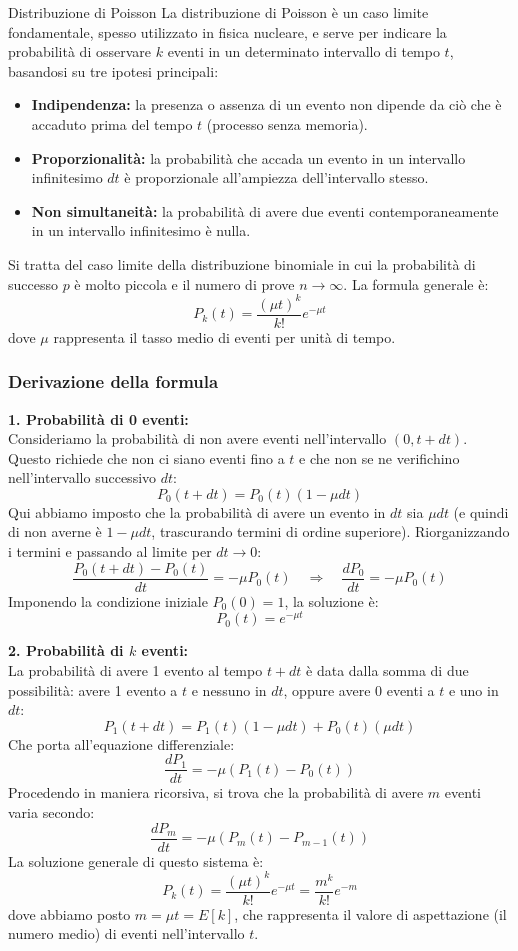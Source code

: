 \documentclass[openany,a4paper,12pt]{book}
\theoremstyle{remark}
\begin{document}
\begin{bressan}{Distribuzione di Poisson}
La distribuzione di Poisson è un caso limite fondamentale, spesso utilizzato in fisica nucleare, e serve per indicare la probabilità di osservare $k$ eventi in un determinato intervallo di tempo $t$, basandosi su tre ipotesi principali:
\begin{itemize}
    \item \textbf{Indipendenza:} la presenza o assenza di un evento non dipende da ciò che è accaduto prima del tempo $t$ (processo senza memoria).
    \item \textbf{Proporzionalità:} la probabilità che accada un evento in un intervallo infinitesimo $dt$ è proporzionale all'ampiezza dell'intervallo stesso.
    \item \textbf{Non simultaneità:} la probabilità di avere due eventi contemporaneamente in un intervallo infinitesimo è nulla.
\end{itemize}

Si tratta del caso limite della distribuzione binomiale in cui la probabilità di successo $p$ è molto piccola e il numero di prove $n \rightarrow \infty$. La formula generale è:
\[
    P_k(t)=\frac{(\mu t)^k}{k!}e^{-\mu t}
\]
dove $\mu$ rappresenta il tasso medio di eventi per unità di tempo.

\subsubsection*{Derivazione della formula}

\textbf{1. Probabilità di 0 eventi:} \\
Consideriamo la probabilità di non avere eventi nell'intervallo $(0, t+dt)$. Questo richiede che non ci siano eventi fino a $t$ e che non se ne verifichino nell'intervallo successivo $dt$:
\[
P_0(t+dt)=P_0(t)(1-\mu dt)
\]
Qui abbiamo imposto che la probabilità di avere un evento in $dt$ sia $\mu dt$ (e quindi di non averne è $1-\mu dt$, trascurando termini di ordine superiore). Riorganizzando i termini e passando al limite per $dt \to 0$:
\[
\frac{P_0(t+dt) - P_0(t)}{dt} = -\mu P_0(t) \quad \Rightarrow \quad \frac{dP_0}{dt} = -\mu P_0(t)
\]
Imponendo la condizione iniziale $P_0(0)=1$, la soluzione è:
\[
P_0(t)=e^{-\mu t}
\]

\textbf{2. Probabilità di $k$ eventi:} \\
La probabilità di avere 1 evento al tempo $t+dt$ è data dalla somma di due possibilità: avere 1 evento a $t$ e nessuno in $dt$, oppure avere 0 eventi a $t$ e uno in $dt$:
\[
P_1(t+dt)=P_1(t)(1-\mu dt) + P_0(t)(\mu dt)
\]
Che porta all'equazione differenziale:
\[
\frac{dP_1}{dt}=- \mu (P_1(t)-P_0(t))
\]
Procedendo in maniera ricorsiva, si trova che la probabilità di avere $m$ eventi varia secondo:
\[
\frac{dP_m}{dt}=- \mu (P_m(t)-P_{m-1}(t))
\]
La soluzione generale di questo sistema è:
\[
P_k(t)=\frac{(\mu t)^k}{k!}e^{-\mu t}=\frac{m^k}{k!}e^{-m}
\]
dove abbiamo posto $m=\mu t=E[k]$, che rappresenta il valore di aspettazione (il numero medio) di eventi nell'intervallo $t$.


\end{bressan}
\end{document}
